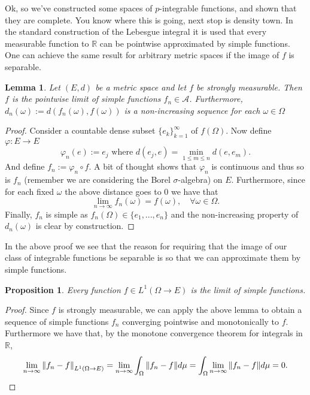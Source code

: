 \documentclass[12pt]{article}
\newtheorem{proposition}{Proposition}
\newtheorem{lemma}{Lemma}
\newcommand{\Aa}{\mathcal{A}}\newcommand{\Bb}{\mathcal{B}}\newcommand{\Cc}{\mathcal{C}}\newcommand{\Ee}{\mathcal{E}}\newcommand{\Ff}{\mathcal{F}}\newcommand{\Gg}{\mathcal{G}}\newcommand{\Hh}{\mathcal{H}}\newcommand{\Kk}{\mathcal{K}}\newcommand{\Ll}{\mathcal{L}}\newcommand{\Mm}{\mathcal{M}}\newcommand{\Nn}{\mathcal{N}}\newcommand{\Pp}{\mathcal{P}}\newcommand{\Qq}{\mathcal{Q}}\newcommand{\Rr}{{\mathcal R}}\newcommand{\Tt}{{\mathcal T}}\newcommand{\Zz}{{\mathcal Z}}\newcommand{\Uu}{{\mathcal U}}
\begin{document}
Ok, so we've constructed some spaces of $p$-integrable functions, and shown that they are complete. You know where this is going, next stop is density town. In the standard construction of the Lebesgue integral it is used that every measurable function to $\mathbb{R}$ can be pointwise approximated by simple functions. One can achieve the same result for arbitrary metric spaces if the image of $f$ is separable.
\begin{lemma}
	Let $(E,d)$ be a metric space and let $f$ be strongly measurable. Then $f$ is the pointwise limit of simple functions $f_n \in \Aa$. Furthermore, \\$d_n(\omega):=d(f_n(\omega),f(\omega))$ is a non-increasing sequence for each $\omega\in\Omega$
\end{lemma}
\begin{proof}
	Consider a countable dense subset $\{e_k\}_{k=1}^\infty$ of $f(\Omega)$. Now define $\varphi:E\to E$
	\begin{equation*}
		\varphi_n(e):= e_j \text{ where }  d(e_j,e)=\min_{1\leq m\leq n} d(e,e_m).
	\end{equation*}
	And define $f_n:=\varphi_n \circ f$. A bit of thought shows that $\varphi_n$ is continuous and thus so is $f_n$ (remember we are considering the Borel $\sigma $-algebra) on $E$.
	Furthermore, since for each fixed $\omega$ the above distance goes to $0$ we have that
	\begin{equation*}
		\lim_{n\to\infty} f_n(\omega)=f(\omega),\quad \forall \omega\in\Omega.
	\end{equation*}
	Finally, $f_n$ is simple as $f_n(\Omega)\in \{e_1,...,e_n\}$ and the non-increasing property of $d_n(\omega)$ is clear by construction.
\end{proof}
In the above proof we see that the reason for requiring that the image of our class of integrable functions be separable is so that we can approximate them by simple functions.
\begin{proposition}
	Every function $f\in L^1(\Omega\to E)$ is the limit of simple functions.
\end{proposition}
\begin{proof}
	Since $f$ is strongly measurable, we can apply the above lemma to obtain a sequence of simple functions $f_n$ converging pointwise and monotonically to $f$. Furthermore we have that, by the monotone convergence theorem for integrals in $\mathbb{R}$,
	\begin{equation*}
		\lim_{n\to\infty}\norm{f_n-f}_{L^1(\Omega\to E)}=\lim_{n\to\infty}\int_\Omega\norm{f_n-f}d\mu=\int_{\Omega}\lim_{n \to \infty}\|f_n-f\| d\mu =0.
	\end{equation*}
\end{proof}
\end{document}
